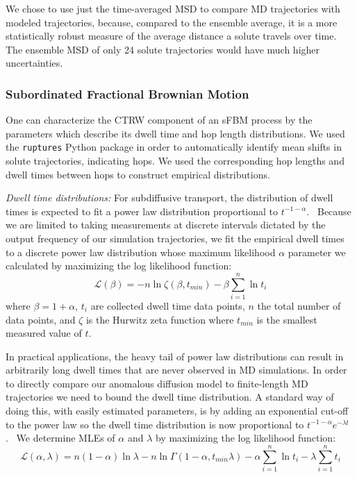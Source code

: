 \documentclass[aps,pre,preprint,groupedaddress,longbibliography]{revtex4-2}
\begin{document}
  We chose to use just the time-averaged MSD to compare MD trajectories with
  modeled trajectories, because, compared to the ensemble average, it is a more
  statistically robust measure of the average distance a solute travels over
  time. The ensemble MSD of only 24 solute trajectories would have much higher
  uncertainties.
  
  \subsubsection{Subordinated Fractional Brownian Motion}\label{method:sfbm}

  One can characterize the CTRW component of an sFBM process by the parameters
  which describe its dwell time and hop length distributions. We used the
  \texttt{ruptures} Python package in order to automatically identify mean
  shifts in solute trajectories, indicating hops.\cite{truong_ruptures:_2018}
  We used the corresponding hop lengths and dwell times between hops to
  construct empirical distributions.
  
  \textit{Dwell time distributions:} For subdiffusive transport, the distribution 
  of dwell times is expected to fit a power law distribution 
  proportional to $t^{-1-\alpha}$.~\cite{meroz_toolbox_2015}
  Because we are limited to taking measurements at discrete intervals dictated by the output 
  frequency of our simulation trajectories, we fit the empirical dwell times
  to a discrete power law distribution whose maximum likelihood $\alpha$ 
  parameter we calculated by maximizing the log likelihood function: 
  \begin{equation}
	\mathcal{L}(\beta) = -n\ln \zeta(\beta, t_{min}) -
	\beta\sum_{i=1}^{n} \ln t_i 
  \label{eqn:powerlaw_likelihood}
  \end{equation}
  where $\beta = 1 + \alpha$, $t_i$ are collected dwell time data points,
  $n$ the total number of data points, and $\zeta$ is the Hurwitz zeta function
  where $t_{min}$ is the smallest measured value of $t$.~\cite{clauset_power-law_2009}
  
  In practical applications, the heavy tail of power law distributions can result in 
  arbitrarily long dwell times that are never observed in MD simulations. 
  In order to directly compare our anomalous diffusion model to finite-length MD 
  trajectories we need to bound the dwell time distribution. A standard way of 
  doing this, with easily estimated parameters, is by adding an exponential 
  cut-off to the power law so the dwell time distribution is now proportional 
  to $t^{-1 - \alpha}e^{-\lambda t}$.~\cite{newman_power_2005,clauset_power-law_2009}  %
  We determine MLEs of $\alpha$ and $\lambda$ by maximizing the log 
  likelihood function:~\cite{clauset_power-law_2009}
  \begin{equation}
    \mathcal{L}(\alpha, \lambda) = n(1 - \alpha)\ln\lambda - n\ln\Gamma(1 - \alpha, t_{min}\lambda) - \alpha\sum_{i=1}^{n}\ln t_i - \lambda\sum_{i=1}^n t_i
  \label{eqn:powerlaw_cutoff_likelihood}
  \end{equation}
  
\end{document}
